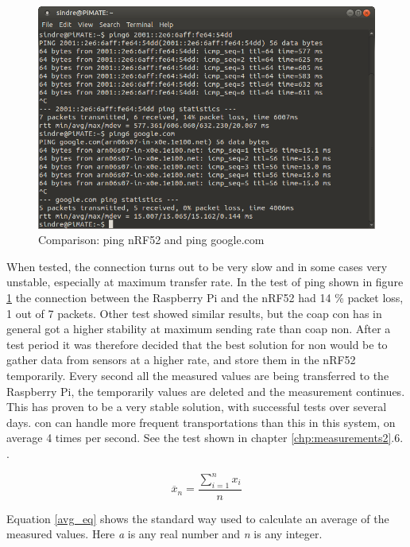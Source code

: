 \begin{figure}[ht]
    \centering
    \includegraphics[scale=0.5]{ping6test.png}    
    \caption{Comparison: ping nRF52 and ping google.com}
    \label{fig:pingComparison}
\end{figure}

When tested, the connection turns out to be very slow and in some cases very unstable, especially at maximum transfer rate. In the test of ping shown in figure \ref{fig:pingComparison} the connection between the Raspberry Pi and the nRF52 had 14 \% packet loss, 1 out of 7 packets. Other test showed similar results, but the \gls{coap} \gls{con} has in general got a  higher stability at maximum sending rate than \gls{coap} \gls{non}. After a test period it was therefore decided that the best solution for \gls{non} would be to gather data from sensors at a higher rate, and store them in the nRF52 temporarily. Every second all the measured values are being transferred to the Raspberry Pi, the temporarily values are deleted and the measurement continues. This has proven to be a very stable solution, with successful tests over several days. \gls{con} can handle more frequent transportations than this in this system, on average 4 times per second. See the test shown in chapter \ref{chp:measurements2}.6. . 

\begin{equation} \label{avg_eq}
    \overline{x}_{n} = \frac{\sum\limits_{i=1}^n x_{i}}{n}
\end{equation}

Equation \ref{avg_eq} shows the standard way used to calculate an average of the measured values. Here \textit{a} is any real number and \textit{n} is any integer. 

